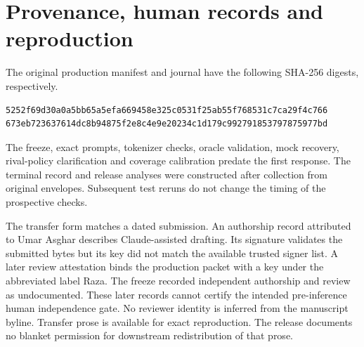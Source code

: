 \section{Provenance, human records and reproduction}
The original production manifest and journal have the following SHA-256 digests, respectively.
{\small\begin{verbatim}
5252f69d30a0a5bb65a5efa669458e325c0531f25ab55f768531c7ca29f4c766
673eb723637614dc8b94875f2e8c4e9e20234c1d179c992791853797875977bd
\end{verbatim}}
The freeze, exact prompts, tokenizer checks, oracle validation, mock recovery, rival-policy clarification and coverage calibration predate the first response. The terminal record and release analyses were constructed after collection from original envelopes. Subsequent test reruns do not change the timing of the prospective checks.

The transfer form matches a dated submission. An authorship record attributed to Umar Asghar describes Claude-assisted drafting. Its signature validates the submitted bytes but its key did not match the available trusted signer list. A later review attestation binds the production packet with a key under the abbreviated label Raza. The freeze recorded independent authorship and review as undocumented. These later records cannot certify the intended pre-inference human independence gate. No reviewer identity is inferred from the manuscript byline. Transfer prose is available for exact reproduction. The release documents no blanket permission for downstream redistribution of that prose.

